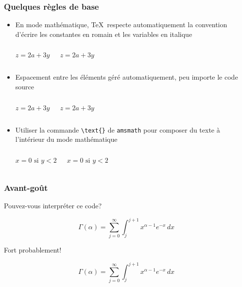 \begin{frame}[c,fragile]

	\frametitle{Quelques règles de base}
	
	\begin{itemize}
		\item En mode mathématique, \TeX\ respecte automatiquement la convention d’écrire les constantes en romain et les variables en italique
		\begin{columns}
			\vspace{-1.4em}
			\begin{codesource}
	$z = 2a + 3y$	
			\end{codesource}
				$z = 2a + 3y$
		\end{columns}
	
		\item Espacement entre les éléments géré automatiquement, peu importe le code source
		\begin{columns}
			\column{.4\textwidth}
			\vspace{-1.4em}
				\begin{codesource}
	$z=2 a+3 y$
				\end{codesource}
			\column{.4\textwidth}
				$z=2 a+3 y$
		\end{columns}
	
		\item Utiliser la commande \lstinline|\text{}| de \texttt{amsmath} pour composer du
			texte à l’intérieur du mode mathématique
		\begin{columns}
			\vspace{-1.4em}
				\begin{codesource}
	$x = 0 \text{ si } y < 2$
				\end{codesource}
				$x = 0 \text{ si } y < 2$
		\end{columns}
	\end{itemize}
\end{frame}


\begin{frame}[fragile]

	\frametitle{Avant-goût}
	
	Pouvez-vous interpréter ce code?
	
	\begin{codesource}
	\begin{equation*}
		\Gamma(\alpha) =
		\sum_{j = 0}^\infty \int_j^{j + 1}
		x^{\alpha - 1} e^{-x}\, dx
	\end{equation*}
	\end{codesource}

	\pause

	Fort probablement!
	
	\begin{equation*}
		\Gamma(\alpha) =
		\sum_{j = 0}^\infty \int_j^{j + 1}
		x^{\alpha - 1} e^{-x}\, dx
	\end{equation*}
\end{frame}